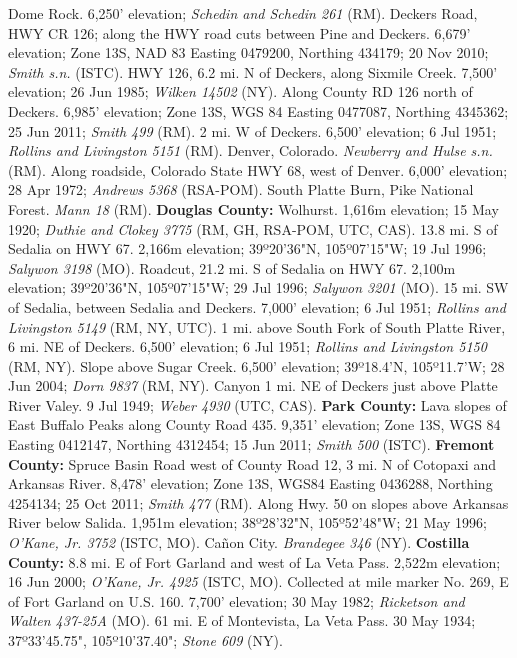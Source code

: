 Dome Rock. 6,250' elevation; \textit{Schedin and Schedin 261} (RM).
Deckers Road, HWY CR 126; along the HWY road cuts between Pine and Deckers.
6,679' elevation; Zone 13S, NAD 83 Easting 0479200, Northing 434179;
20 Nov 2010; \textit{Smith s.n.} (ISTC).
HWY 126, 6.2 mi. N of Deckers, along Sixmile Creek. 7,500' elevation;
26 Jun 1985; \textit{Wilken 14502} (NY).
Along County RD 126 north of Deckers. 6,985' elevation; Zone 13S,
WGS 84 Easting 0477087, Northing 4345362; 25 Jun 2011; \textit{Smith 499} (RM).
2 mi. W of Deckers. 6,500' elevation; 6 Jul 1951;
\textit{Rollins and Livingston 5151} (RM).
Denver, Colorado. \textit{Newberry and Hulse s.n.} (RM).
Along roadside, Colorado State HWY 68, west of Denver. 6,000' elevation;
28 Apr 1972; \textit{Andrews 5368} (RSA-POM).
South Platte Burn, Pike National Forest. \textit{Mann 18} (RM).
  \textbf{Douglas County:}
Wolhurst. 1,616m elevation; 15 May 1920;
\textit{Duthie and Clokey 3775} (RM, GH, RSA-POM, UTC, CAS).
13.8 mi. S of Sedalia on HWY 67. 2,166m elevation; 39º20'36"N, 105º07'15"W;
19 Jul 1996; \textit{Salywon 3198} (MO).
Roadcut, 21.2 mi. S of Sedalia on HWY 67. 2,100m elevation;
39º20'36"N, 105º07'15"W; 29 Jul 1996; \textit{Salywon 3201} (MO).
15 mi. SW of Sedalia, between Sedalia and Deckers. 7,000' elevation;
6 Jul 1951; \textit{Rollins and Livingston 5149} (RM, NY, UTC).
1 mi. above South Fork of South Platte River, 6 mi. NE of Deckers.
6,500' elevation; 6 Jul 1951; \textit{Rollins and Livingston 5150} (RM, NY).
Slope above Sugar Creek. 6,500' elevation; 39º18.4'N, 105º11.7'W;
28 Jun 2004; \textit{Dorn 9837} (RM, NY).
Canyon 1 mi. NE of Deckers just above Platte River Valey. 9 Jul 1949;
\textit{Weber 4930} (UTC, CAS).
  \textbf{Park County:}
Lava slopes of East Buffalo Peaks along County Road 435. 9,351' elevation;
Zone 13S, WGS 84 Easting 0412147, Northing 4312454; 15 Jun 2011;
\textit{Smith 500} (ISTC).
  \textbf{Fremont County:}
Spruce Basin Road west of County Road 12, 3 mi. N of Cotopaxi and Arkansas
River. 8,478' elevation; Zone 13S, WGS84 Easting 0436288, Northing 4254134;
25 Oct 2011; \textit{Smith 477} (RM).
Along Hwy. 50 on slopes above Arkansas River below Salida. 1,951m elevation;
38º28'32"N, 105º52'48"W; 21 May 1996; \textit{O'Kane, Jr. 3752} (ISTC, MO).
Cañon City. \textit{Brandegee 346} (NY).
  \textbf{Costilla County:}
8.8 mi. E of Fort Garland and west of La Veta Pass. 2,522m elevation;
16 Jun 2000; \textit{O'Kane, Jr. 4925} (ISTC, MO).
Collected at mile marker No. 269, E of Fort Garland on U.S. 160.
7,700' elevation; 30 May 1982; \textit{Ricketson and Walten 437-25A} (MO).
61 mi. E of Montevista, La Veta Pass. 30 May 1934;
37º33'45.75", 105º10'37.40"; \textit{Stone 609} (NY).

